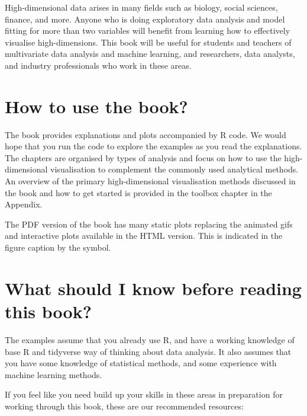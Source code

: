 \documentclass[
  letterpaper,
]{krantz}
\begin{document}

High-dimensional data arises in many fields such as biology, social
sciences, finance, and more. Anyone who is doing exploratory data
analysis and model fitting for more than two variables will benefit from
learning how to effectively visualise high-dimensions. This book will be
useful for students and teachers of multivariate data analysis and
machine learning, and researchers, data analysts, and industry
professionals who work in these areas.

\section*{How to use the book?}\label{how-to-use-the-book}


The book provides explanations and plots accompanied by R code. We would
hope that you run the code to explore the examples as you read the
explanations. The chapters are organised by types of analysis and focus
on how to use the high-dimensional visualisation to complement the
commonly used analytical methods. An overview of the primary
high-dimensional visualisation methods discussed in the book and how to
get started is provided in the toolbox chapter in the Appendix.

The PDF version of the book has many static plots replacing the animated
gifs and interactive plots available in the HTML version. This is
indicated in the figure caption by the  symbol.

\section*{What should I know before reading this
book?}\label{what-should-i-know-before-reading-this-book}


The examples assume that you already use R, and have a working knowledge
of base R and tidyverse way of thinking about data analysis. It also
assumes that you have some knowledge of statistical methods, and some
experience with machine learning methods.

If you feel like you need build up your skills in these areas in
preparation for working through this book, these are our recommended
resources:
\end{document}
